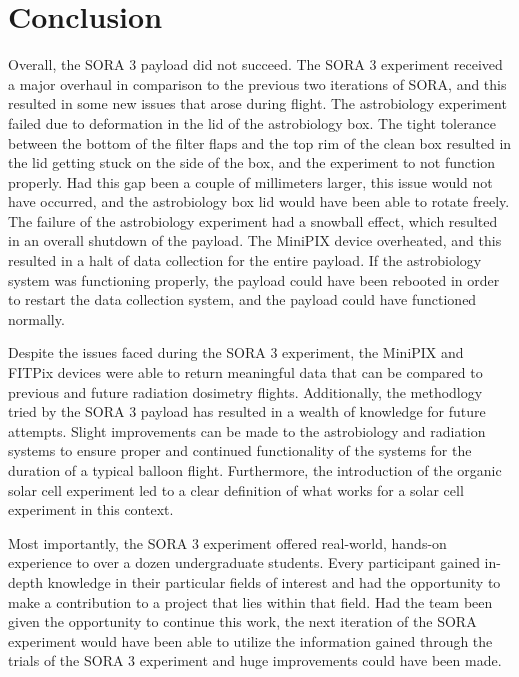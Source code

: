 \section{Conclusion}
\label{sec:Conclusion}

Overall, the SORA 3 payload did not succeed.
The SORA 3 experiment received a major overhaul in comparison to the previous two iterations of SORA, and this resulted in some new issues that arose during flight.
The astrobiology experiment failed due to deformation in the lid of the astrobiology box.
The tight tolerance between the bottom of the filter flaps and the top rim of the clean box resulted in the lid getting stuck on the side of the box, and the experiment to not function properly.
Had this gap been a couple of millimeters larger, this issue would not have occurred, and the astrobiology box lid would have been able to rotate freely.
The failure of the astrobiology experiment had a snowball effect, which resulted in an overall shutdown of the payload.
The MiniPIX device overheated, and this resulted in a halt of data collection for the entire payload.
If the astrobiology system was functioning properly, the payload could have been rebooted in order to restart the data collection system, and the payload could have functioned normally.

Despite the issues faced during the SORA 3 experiment, the MiniPIX and FITPix devices were able to return meaningful data that can be compared to previous and future radiation dosimetry flights.
Additionally, the methodlogy tried by the SORA 3 payload has resulted in a wealth of knowledge for future attempts.
Slight improvements can be made to the astrobiology and radiation systems to ensure proper and continued functionality of the systems for the duration of a typical balloon flight.
Furthermore, the introduction of the organic solar cell experiment led to a clear definition of what works for a solar cell experiment in this context.

Most importantly, the SORA 3 experiment offered real-world, hands-on experience to over a dozen undergraduate students.
Every participant gained in-depth knowledge in their particular fields of interest and had the opportunity to make a contribution to a project that lies within that field.
Had the team been given the opportunity to continue this work, the next iteration of the SORA experiment would have been able to utilize the information gained through the trials of the SORA 3 experiment and huge improvements could have been made.



